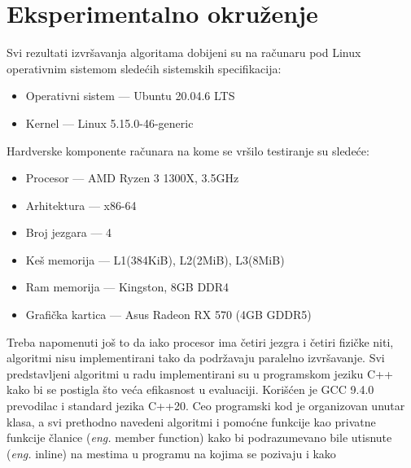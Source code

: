 \documentclass[12pt,oneside]{memoir}
\begin{document}
\section{Eksperimentalno okruženje}
\label{sec:ekspOkruženje}
Svi rezultati izvršavanja algoritama dobijeni su na računaru pod Linux operativnim sistemom
sledećih sistemskih specifikacija:
\begin{itemize}
  \item Operativni sistem — Ubuntu 20.04.6 LTS
  \item Kernel — Linux 5.15.0-46-generic
\end{itemize}
Hardverske komponente računara na kome se vršilo testiranje su sledeće:
\begin{itemize}
  \item Procesor — AMD Ryzen 3 1300X, 3.5GHz
  \item Arhitektura — x86-64
  \item Broj jezgara — 4
  \item Keš memorija — L1(384KiB), L2(2MiB), L3(8MiB)
  \item Ram memorija — Kingston, 8GB DDR4
  \item Grafička kartica — Asus Radeon RX 570 (4GB GDDR5)
\end{itemize}
Treba napomenuti još to da iako procesor ima četiri jezgra i četiri
fizičke niti, algoritmi nisu implementirani tako da podržavaju paralelno izvršavanje.
Svi predstavljeni algoritmi u radu implementirani su u programskom jeziku C++
kako bi se postigla što veća efikasnost u evaluaciji. Korišćen je
GCC 9.4.0 prevodilac i standard jezika C++20. Ceo programski kod je organizovan
unutar klasa, a svi prethodno navedeni algoritmi i pomoćne funkcije kao privatne
funkcije članice (\textit{eng.} member function) kako bi podrazumevano bile
utisnute (\textit{eng.} inline) na mestima u programu na kojima se pozivaju i kako
\end{document}
